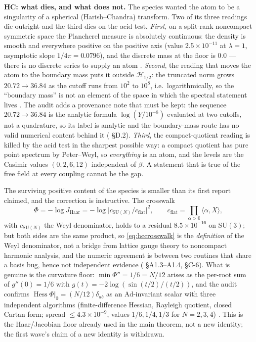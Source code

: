 \textbf{HC: what dies, and what does not.} The species wanted the atom to be a singularity of a
spherical (Harish--Chandra) transform. Two of its three readings die outright and the third dies on
the acid test. \emph{First}, on a split-rank noncompact symmetric space the Plancherel measure is
absolutely continuous: the density is smooth and everywhere positive on the positive axis (value
$2.5\times10^{-11}$ at $\lambda=1$, asymptotic slope $1/4\pi=0.0796$), and the discrete mass at the
floor is $0.0$ --- there is no discrete series to supply an atom \LN. \emph{Second}, the reading
that moves the atom to the boundary mass puts it outside $\mathcal H_{1/2}$: the truncated norm
grows $20.72\to36.84$ as the cutoff runs from $10^2$ to $10^8$, i.e.\ logarithmically, so the
``boundary mass'' is not an element of the space in which the spectral statement lives \LN.
The audit adds a provenance note that must be kept: the sequence $20.72\to36.84$ is the analytic
formula $\log(Y/10^{-8})$ evaluated at two cutoffs, not a quadrature, so its label is analytic and
the boundary-mass route has no valid numerical content behind it ( \S D.2).
\emph{Third}, the compact-quotient reading is killed by the acid test in the sharpest possible way:
a compact quotient has pure point spectrum by Peter--Weyl, so \emph{everything} is an atom, and the
levels are the Casimir values $(0,2,6,12)$ independent of $\beta$. A statement that is true of the
free field at every coupling cannot be the gap.

The surviving positive content of the species is smaller than its first report claimed, and the
correction is instructive. The crosswalk
\[
  \Phi=-\log J_{\mathrm{Haar}}=-\log\lvert c_{\mathrm{SU}(N)}/c_{\mathrm{flat}}\rvert^2,
  \qquad c_{\mathrm{flat}}=\prod_{\alpha>0}\langle\alpha,X\rangle,
  \label{eq:hccrosswalk}
\]
with $c_{\mathrm{SU}(N)}$ the Weyl denominator, holds to a residual $8.5\times10^{-16}$ on
$\mathrm{SU}(3)$; but both sides are the same product, so \eqref{eq:hccrosswalk} is the
\emph{definition} of the Weyl denominator, not a bridge from lattice gauge theory to noncompact
harmonic analysis, and the numeric agreement is between two routines that share a basis bug, hence
not independent evidence ( \S A1.3--A1.4, \S C-6). What is genuine is the
curvature floor: $\min\Phi''=1/6=N/12$ arises as the per-root sum of $g''(0)=1/6$ with
$g(t)=-2\log(\sin(t/2)/(t/2))$, and the audit confirms $\operatorname{Hess}\Phi|_0=(N/12)\delta_{ab}$
as an $\mathrm{Ad}$-invariant scalar with three independent algorithms (finite-difference Hessian,
Rayleigh quotient, closed Cartan form; spread $\le4.3\times10^{-9}$, values $1/6,1/4,1/3$ for
$N=2,3,4$) \LT. This is the Haar/Jacobian floor already used in the main theorem, not a new
identity; the first wave's claim of a new identity is withdrawn.

